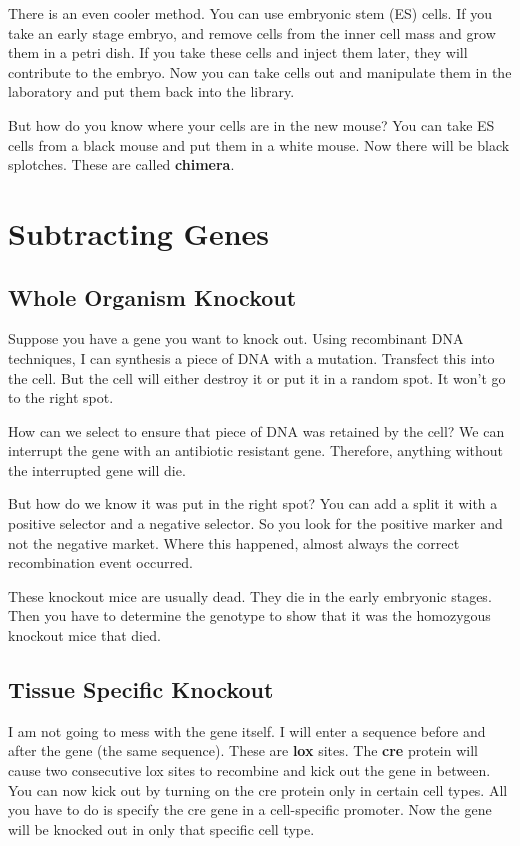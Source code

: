 \documentclass{article}
\begin{document}
There is an even cooler method. You can use embryonic stem (ES) cells. If you take an early stage embryo, and remove cells from the inner cell mass and grow them in a petri dish. If you take these cells and inject them later, they will contribute to the embryo. Now you can take cells out and manipulate them in the laboratory and put them back into the library.

But how do you know where your cells are in the new mouse? You can take ES cells from a black mouse and put them in a white mouse. Now there will be black splotches. These are called \textbf{chimera}.

\section{Subtracting Genes}

\subsection{Whole Organism Knockout}

Suppose you have a gene you want to knock out. Using recombinant DNA techniques, I can synthesis a piece of DNA with a mutation. Transfect this into the cell. But the cell will either destroy it or put it in a random spot. It won't go to the right spot. 

How can we select to ensure that piece of DNA was retained by the cell? We can interrupt the gene with an antibiotic resistant gene. Therefore, anything without the interrupted gene will die.

But how do we know it was put in the right spot? You can add a split it with a positive selector and a negative selector. So you look for the positive marker and not the negative market. Where this happened, almost always the correct recombination event occurred.

These knockout mice are usually dead. They die in the early embryonic stages. Then you have to determine the genotype to show that it was the homozygous knockout mice that died.

\subsection{Tissue Specific Knockout}

I am not going to mess with the gene itself. I will enter a sequence before and after the gene (the same sequence). These are \textbf{lox} sites. The \textbf{cre} protein will cause two consecutive lox sites to recombine and kick out the gene in between. You can now kick out by turning on the cre protein only in certain cell types. All you have to do is specify the cre gene in a cell-specific promoter. Now the gene will be knocked out in only that specific cell type.
\end{document}
